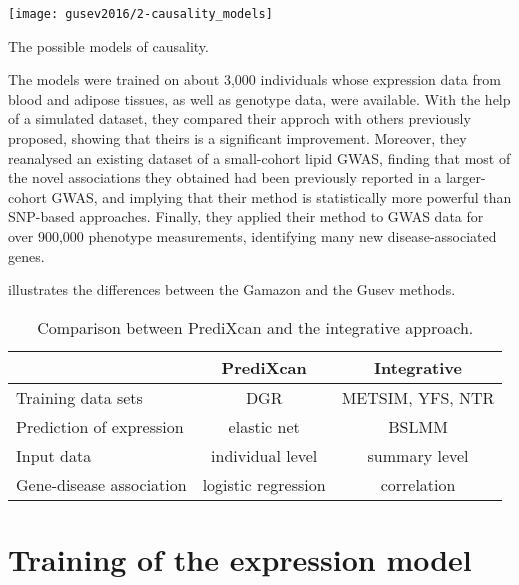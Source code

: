 \documentclass[../main.tex]{subfiles}
\begin{document}
\begin{marginfigure}
	\texttt{[image: gusev2016/2-causality\_models]}
	\caption{The possible models of causality.}
\end{marginfigure}

The models were trained on about 3,000 individuals whose expression data 
from blood and adipose tissues, as well as genotype data, were 
available. With the help of a simulated dataset, they compared their 
approch with others previously proposed, showing that theirs is a 
significant improvement. Moreover, they reanalysed an existing dataset 
of a small-cohort lipid GWAS, finding that most of the novel 
associations they obtained had been previously reported in a 
larger-cohort GWAS, and implying that their method is statistically more 
powerful than SNP-based approaches. Finally, they applied their method 
to GWAS data for over 900,000 phenotype measurements, identifying many 
new disease-associated genes.

 illustrates the differences between the Gamazon and 
the Gusev methods.

\begin{table}
	\begin{tabular}{ l c c }
		\toprule
		& PrediXcan & Integrative \\
		\midrule
		Training data sets & DGR & METSIM, YFS, NTR \\
		Prediction of expression & elastic net & BSLMM \\
		Input data & individual level & summary level \\
		Gene-disease association & logistic regression & correlation \\
		\bottomrule
	\end{tabular}
	\caption{Comparison between PrediXcan and the integrative approach.}
\end{table}

\section{Training of the expression model}
\end{document}
